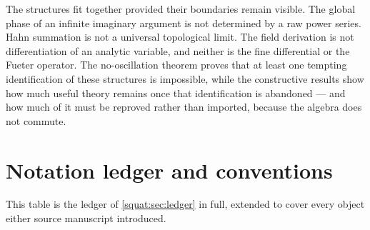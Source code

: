 \documentclass[11pt,letterpaper]{article}
\numberwithin{equation}{section}
\theoremstyle{definition}
\theoremstyle{remark}
\begin{document}
The structures fit together provided their boundaries remain visible. The global phase of
an infinite imaginary argument is not determined by a raw power series. Hahn summation is
not a universal topological limit. The field derivation is not differentiation of an
analytic variable, and neither is the fine differential or the Fueter operator. The
no-oscillation theorem proves that at least one tempting identification of these structures
is impossible, while the constructive results show how much useful theory remains once that
identification is abandoned --- and how much of it must be reproved rather than imported,
because the algebra does not commute.

\appendix
\section{Notation ledger and conventions}\label{squat:app:ledger}

This table is the ledger of \cref{squat:sec:ledger} in full, extended to cover every
object either source manuscript introduced.
\end{document}
